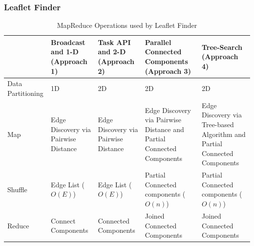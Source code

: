 \subsubsection{Leaflet Finder}
\label{sec:leaflet}
\begin{table}[ht]
    \centering
    \begin{tabular}{@{}p{2cm}|p{2.8cm}p{2.8cm}p{2.8cm}p{2.8cm}@{}}
        \toprule
        &
        \textbf{Broadcast and 1-D} (Approach 1) &
        \textbf{Task API and 2-D} (Approach 2) &
        \textbf{Parallel Connected Components} (Approach 3) &
        \textbf{Tree-Search} (Approach 4)\\
        \midrule
        Data Partitioning  & 
        1D  & 
        2D & 
        2D & 
        2D\\
        Map & 
        Edge Discovery via Pairwise Distance &
        Edge Discovery via Pairwise Distance &
        Edge Discovery via Pairwise Distance and Partial Connected Components & 
        Edge Discovery via Tree-based Algorithm and Partial Connected Components\\
        Shuffle &
        Edge List ($O(E)$) &
        Edge List ($O(E)$) &
        Partial Connected components ($O(n)$) &
        Partial Connected components ($O(n)$)\\
        Reduce   &
        Connect Components  &
        Connected Components &
        Joined Connected Components &
        Joined Connected Components\\
        \bottomrule
    \end{tabular}
    \caption{MapReduce Operations used by Leaflet Finder\label{tab:app_operators}}
\end{table}

